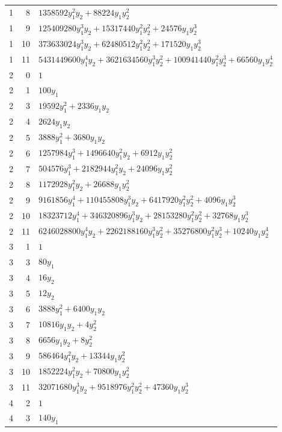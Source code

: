 \documentclass[10pt,a4paper]{article}
\begin{document}
{\begin{longtable}{rrp{125mm}}
1 & 8 & $1358592 y_{1}^{2} y_{2} + 88224 y_{1} y_{2}^{2}$\\
1 & 9 & $125409280 y_{1}^{3} y_{2} + 15317440 y_{1}^{2} y_{2}^{2} + 24576 y_{1} y_{2}^{3}$\\
1 & 10 & $373633024 y_{1}^{3} y_{2} + 62480512 y_{1}^{2} y_{2}^{2} + 171520 y_{1} y_{2}^{3}$\\
1 & 11 & $5431449600 y_{1}^{4} y_{2} + 3621634560 y_{1}^{3} y_{2}^{2} + 100941440 y_{1}^{2} y_{2}^{3} + 66560 y_{1} y_{2}^{4}$\\
2 & 0 & $1$\\
2 & 1 & $100 y_{1}$\\
2 & 3 & $19592 y_{1}^{2} + 2336 y_{1} y_{2}$\\
2 & 4 & $2624 y_{1} y_{2}$\\
2 & 5 & $3888 y_{1}^{2} + 3680 y_{1} y_{2}$\\
2 & 6 & $1257984 y_{1}^{3} + 1496640 y_{1}^{2} y_{2} + 6912 y_{1} y_{2}^{2}$\\
2 & 7 & $504576 y_{1}^{3} + 2182944 y_{1}^{2} y_{2} + 24096 y_{1} y_{2}^{2}$\\
2 & 8 & $1172928 y_{1}^{2} y_{2} + 26688 y_{1} y_{2}^{2}$\\
2 & 9 & $9161856 y_{1}^{4} + 110455808 y_{1}^{3} y_{2} + 6417920 y_{1}^{2} y_{2}^{2} + 4096 y_{1} y_{2}^{3}$\\
2 & 10 & $18323712 y_{1}^{4} + 346320896 y_{1}^{3} y_{2} + 28153280 y_{1}^{2} y_{2}^{2} + 32768 y_{1} y_{2}^{3}$\\
2 & 11 & $6246028800 y_{1}^{4} y_{2} + 2262188160 y_{1}^{3} y_{2}^{2} + 35276800 y_{1}^{2} y_{2}^{3} + 10240 y_{1} y_{2}^{4}$\\
3 & 1 & $1$\\
3 & 3 & $80 y_{1}$\\
3 & 4 & $16 y_{2}$\\
3 & 5 & $12 y_{2}$\\
3 & 6 & $3888 y_{1}^{2} + 6400 y_{1} y_{2}$\\
3 & 7 & $10816 y_{1} y_{2} + 4 y_{2}^{2}$\\
3 & 8 & $6656 y_{1} y_{2} + 8 y_{2}^{2}$\\
3 & 9 & $586464 y_{1}^{2} y_{2} + 13344 y_{1} y_{2}^{2}$\\
3 & 10 & $1852224 y_{1}^{2} y_{2} + 70800 y_{1} y_{2}^{2}$\\
3 & 11 & $32071680 y_{1}^{3} y_{2} + 9518976 y_{1}^{2} y_{2}^{2} + 47360 y_{1} y_{2}^{3}$\\
4 & 2 & $1$\\
4 & 3 & $140 y_{1}$\\

\end{longtable}}
\end{document}
